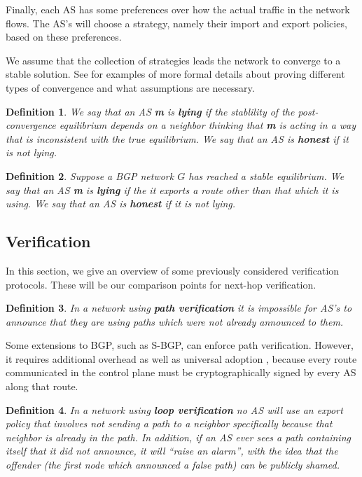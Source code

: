\documentclass[10pt]{article}
\newtheorem{definition}{Definition}
\begin{document}
    Finally, each AS has some preferences over how the actual traffic in the
    network flows. The AS's will choose a strategy, namely their import and export
    policies, based on these preferences.

    We assume that the collection of strategies leads the network to converge to a
    stable solution. See \cite{RoutingGames, Attraction, StablePaths, PolicyPathVector}
    for examples of more formal details about proving different types of convergence
    and what assumptions are necessary.

    \begin{definition}
      We say that an AS \textbf{m} is \textbf{lying} if the
      stablility of the post-convergence equilibrium depends on a neighbor
      thinking that \textbf{m} is acting in a way that is inconsistent with the
      true equilibrium.
      We say that an AS is \textbf{honest} if it is not lying.
    \end{definition}
    \begin{definition}
      Suppose a BGP network $G$ has reached a stable equilibrium.
      We say that an AS \textbf{m} is \textbf{lying} if the
      it exports a route other than that which it is using.
      We say that an AS is \textbf{honest} if it is not lying.
    \end{definition}


  \subsection{Verification}
    In this section, we give an overview of some previously considered 
    verification protocols. These will be our comparison points for next-hop
    verification.

    \begin{definition} 
      In a network using \textbf{path verification} it is
      impossible for AS's to announce that they are using paths which were not
      already announced to them.
    \end{definition}

    Some extensions to BGP, such as S-BGP, can enforce path verification.
    However, it requires additional overhead as well as universal adoption
    \cite{PartialDeploy}, because every route communicated in the control plane
    must be cryptographically signed by every AS along that route.

    \begin{definition}
      In a network using \textbf{loop verification} no AS will
      use an export policy that involves not sending a path to a neighbor
      specifically because that neighbor is already in the path.
      In addition, if
      an AS ever sees a path containing itself that it did not announce, it will
      ``raise an alarm'', with the idea that the offender (the first
      node which announced a false path) can be publicly shamed.
    \end{definition}
\end{document}
